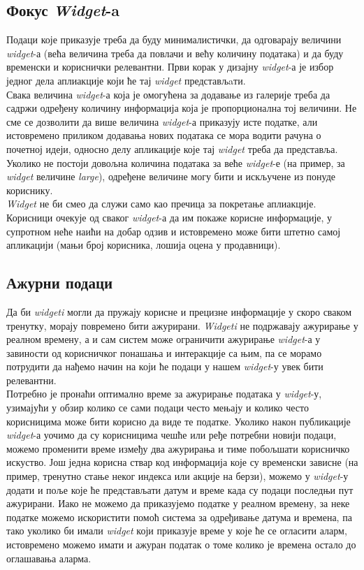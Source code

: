 \documentclass[12pt,oneside]{memoir}
\begin{document}
\subsection{Фокус \textit{Widget}-a}
\indent  Подаци које приказује треба да буду минималистички, да одговарају величини \textit{widget}-а (већа величина треба да повлачи и већу количину података) и да буду временски и кориснички релевантни. Први корак у дизајну \textit{widget}-а је избор једног дела аплиакције који ће тај \textit{widget} представљaти. 
\\
\indent Свака величина \textit{widget}-а која је омогућена за додавање из галерије треба да садржи одређену количину информација која је пропорционална тој величини. Не сме се дозволити да више величина \textit{widget}-а приказују исте податке, али истовремено приликом додавања нових података се мора водити рачуна о почетној идеји, односно делу апликације које тај \textit{widget} треба да представља. Уколико не постоји довољна количина података за веће \textit{widget}-е (на пример, за \textit{widget} величине \textit{large}), одређене величине могу бити и искључене из понуде кориснику.
\\
\indent \textit{Widget} не би смео да служи само као пречица за покретање аплиакције. Корисници очекује од сваког \textit{widget}-а да им покаже корисне информације, у супротном неће наићи на добар одзив и истовремено може бити штетно самој апликацији (мањи број корисника, лошија оцена у продавници).

\subsection{Ажурни подаци}
\indent Да би \textit{widgeti} могли да пружају корисне и прецизне информације у скоро сваком тренутку, морају повремено бити ажурирани. \textit{Widgeti} не подржавају ажурирање у реалном времену, а и сам систем може ограничити ажурирање \textit{widget}-а у завиности од корисничког понашања и интеракције са њим, па се морамо потрудити да нађемо начин на који ће подаци у нашем \textit{widget}-у увек бити релевантни. 
\\
\indent Потребно је пронаћи оптимално време за ажурирање података у \textit{widget}-у, узимајући у обзир колико се сами подаци често мењају и колико често корисницима може бити корисно да виде те податке. Уколико након публикације \textit{widget}-а уочимо да су корисницима чешће или ређе потребни новији подаци, можемо променити време између два ажурирања и тиме побољшати корисничко искуство. Још једна корисна ствар код информација које су временски зависне (на пример, тренутно стање неког индекса или акције на берзи), можемо у \textit{widget}-у додати и поље које ће представљати датум  и време када су подаци последњи пут ажурирани. Иако не можемо да приказујемо податке у реалном времену, за неке податке можемо искористити помоћ система за одређивање датума и времена, па тако уколико би имали \textit{widget} који приказује време у које ће се огласити аларм, истовремено можемо имати и ажуран податак о томе колико је времена остало до оглашавања аларма.  
\end{document}
